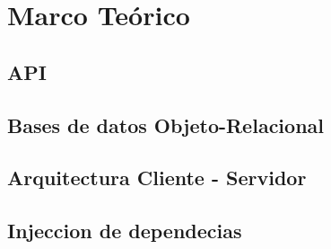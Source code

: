 \chapter{Marco Teórico}
\label{capitulo2}

\section{API}

\section{Bases de datos Objeto-Relacional}

\section{Arquitectura Cliente - Servidor}

\section{Injeccion de dependecias}

